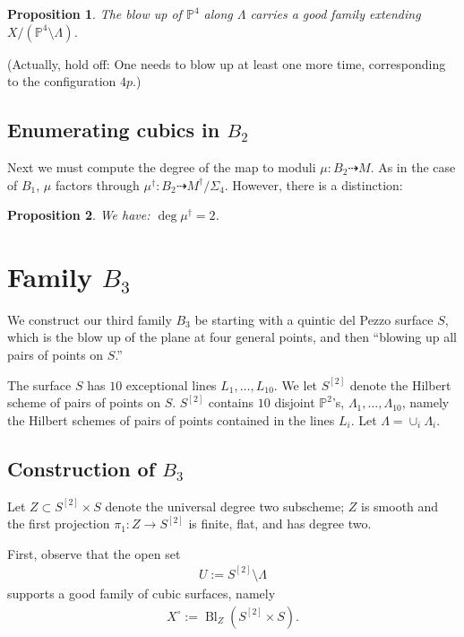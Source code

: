 \documentclass[12 pt]{amsart}
\newtheorem{proposition}{Proposition}[section]
\renewcommand{\P}{\mathbb{P}}
\newcommand{\<}{\left\langle}
\renewcommand{\>}{\right\rangle}
\DeclareMathOperator{\Bl}{Bl}
\begin{document}
\begin{proposition}
  \label{proposition:resolveB2} The blow up of $\P^{4}$ along
  $\Lambda$ carries a good family extending
  $X/(\P^{4} \setminus \Lambda)$.
\end{proposition}
(Actually, hold off: One needs to blow up at least one more time,
corresponding to the configuration $4p$.)
\subsection{Enumerating cubics in $B_2$}
\label{sec:enum-cubics-b_2}

Next we must compute the degree of the map to moduli
$\mu: B_2 \dashrightarrow M$. As in the case of $B_1$, $\mu$ factors
through $\mu^{\dagger}: B_2 \dashrightarrow M^\dagger/\Sigma_{4}$.
However,  there is a distinction:

\begin{proposition}
  \label{proposition:deg-mudagger2}
  We have: $\deg \mu^{\dagger} = 2$.
\end{proposition}

\section{Family $B_3$}
\label{sec:family-b_3}

We construct our third family $B_3$ be starting with a quintic del
Pezzo surface $S$, which is the blow up of the plane at four general
points, and then ``blowing up all pairs of points on $S$.''

The surface $S$ has $10$ exceptional lines $L_{1}, \dots, L_{10}$.  We
let $S^{[2]}$ denote the Hilbert scheme of pairs of points on $S$.
$S^{[2]}$ contains $10$ disjoint $\P^{2}$'s,
$\Lambda_1, \dots, \Lambda_{10}$, namely the Hilbert schemes of pairs
of points contained in the lines $L_{i}$. Let
$\Lambda = \cup_{i}\Lambda_{i}$.

\subsection{Construction of $B_3$}
\label{sec:construction-b_3}

Let $Z \subset S^{[2]} \times S$ denote the universal degree two
subscheme; $Z$ is smooth and the first projection
$\pi_1 : Z \to S^{[2]}$ is finite, flat, and has degree two.



First, observe that the open set
\begin{align}
  \label{eq:UB3}
  U := S^{[2]} \setminus \Lambda
\end{align}
supports a good family of cubic surfaces, namely
\begin{align}
  \label{eq:XUB3}
  X^{\circ} := \Bl_{Z}(S^{[2]} \times S).
\end{align}
\end{document}
